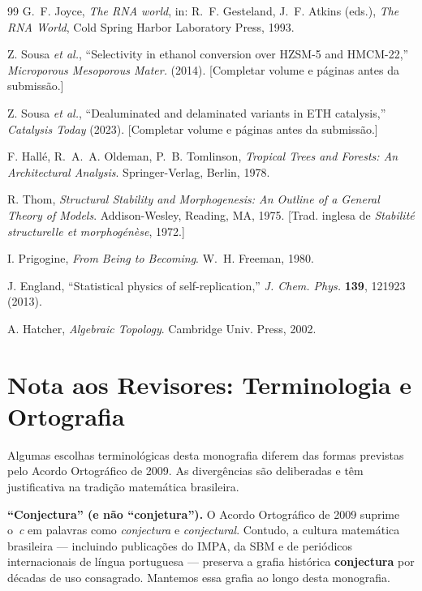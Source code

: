 \documentclass[12pt,a4paper,twoside]{book}
\theoremstyle{plain}
\theoremstyle{definition}
\theoremstyle{definition}
\begin{document}
\begin{thebibliography}{99}
 G.~F. Joyce, \emph{The RNA world}, in: R.~F. Gesteland, J.~F. Atkins (eds.),
  \emph{The RNA World}, Cold Spring Harbor Laboratory Press, 1993.

 Z. Sousa \emph{et al.}, ``Selectivity in ethanol conversion over HZSM-5 and HMCM-22,''
  \emph{Microporous Mesoporous Mater.} (2014). [Completar volume e páginas antes da submissão.]

 Z. Sousa \emph{et al.}, ``Dealuminated and delaminated variants in ETH catalysis,''
  \emph{Catalysis Today} (2023). [Completar volume e páginas antes da submissão.]

 F. Hall\'e, R.~A.~A. Oldeman, P.~B. Tomlinson,
  \emph{Tropical Trees and Forests: An Architectural Analysis}.
  Springer-Verlag, Berlin, 1978.

 R. Thom, \emph{Structural Stability and Morphogenesis:
  An Outline of a General Theory of Models}.
  Addison-Wesley, Reading, MA, 1975. [Trad. inglesa de \emph{Stabilité structurelle et morphogénèse}, 1972.]

 I. Prigogine, \emph{From Being to Becoming}.
  W.~H. Freeman, 1980.

 J. England, ``Statistical physics of self-replication,''
  \emph{J. Chem. Phys.} \textbf{139}, 121923 (2013).

 A. Hatcher, \emph{Algebraic Topology}.
  Cambridge Univ. Press, 2002.

\end{thebibliography}

\chapter*{Nota aos Revisores: Terminologia e Ortografia}

Algumas escolhas terminológicas desta monografia diferem das formas
previstas pelo Acordo Ortográfico de 2009. As divergências são
deliberadas e têm justificativa na tradição matemática brasileira.

\medskip
\textbf{``Conjectura'' (e não ``conjetura'').}
O Acordo Ortográfico de 2009 suprime o~\textit{c} em palavras
como \emph{conjectura} e \emph{conjectural}. Contudo, a cultura
matemática brasileira --- incluindo publicações do IMPA, da SBM
e de periódicos internacionais de língua portuguesa --- preserva
a grafia histórica \textbf{conjectura} por décadas de uso consagrado.
Mantemos essa grafia ao longo desta monografia.
\end{document}
